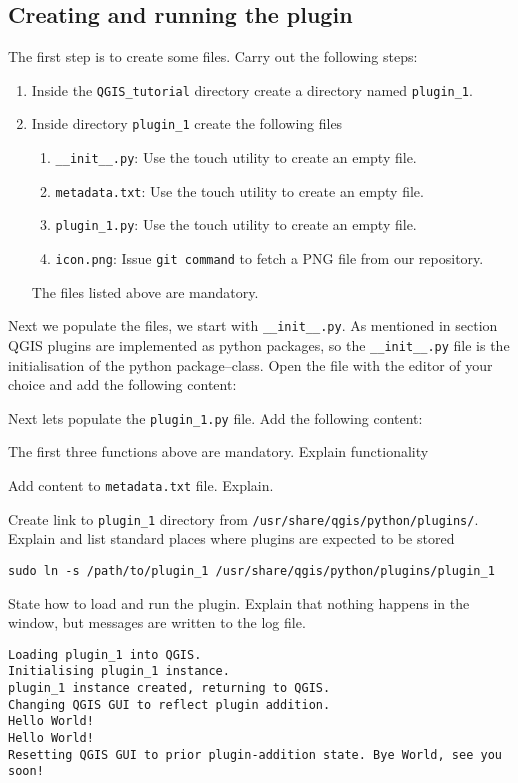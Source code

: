 \subsection{Creating and running the plugin}
\label{ssect:creating_plugin_1}
\par %
The first step is to create some files. Carry out the following steps:
\begin{enumerate}
  \item Inside the \lstinline{QGIS_tutorial} directory create a directory named \lstinline{plugin_1}.
  \item Inside directory \lstinline{plugin_1} create the following files
  \begin{enumerate}
    \item \lstinline{__init__.py}: Use the touch utility to create an empty file.
    \item \lstinline{metadata.txt}: Use the touch utility to create an empty file.
    \item \lstinline{plugin_1.py}: Use the touch utility to create an empty file.
    \item \lstinline{icon.png}: Issue \lstinline{git command} to fetch a PNG file from our repository.
  \end{enumerate}
  The files listed above are mandatory.
\end{enumerate}
Next we populate the files, we start with \lstinline{__init__.py}. As mentioned in section \label{sect:introduction} QGIS plugins are implemented as python packages, so the \lstinline{__init__.py} file is the initialisation of the python package--class. Open the file with the editor of your choice and add the following content:

\par%
Next lets populate the \lstinline{plugin_1.py} file. Add the following content:

The first three functions above are mandatory. Explain functionality
\par%
Add content to \lstinline{metadata.txt} file. Explain.
\par%
Create link to \lstinline{plugin_1} directory from \lstinline{/usr/share/qgis/python/plugins/}. Explain and list standard places where plugins are expected to be stored
\begin{lstlisting}
sudo ln -s /path/to/plugin_1 /usr/share/qgis/python/plugins/plugin_1
\end{lstlisting}
\par%
State how to load and run the plugin. Explain that nothing happens in the window, but messages are written to the log file.
\begin{lstlisting}
Loading plugin_1 into QGIS.
Initialising plugin_1 instance.
plugin_1 instance created, returning to QGIS.
Changing QGIS GUI to reflect plugin addition.
Hello World!
Hello World!
Resetting QGIS GUI to prior plugin-addition state. Bye World, see you soon!
\end{lstlisting}


